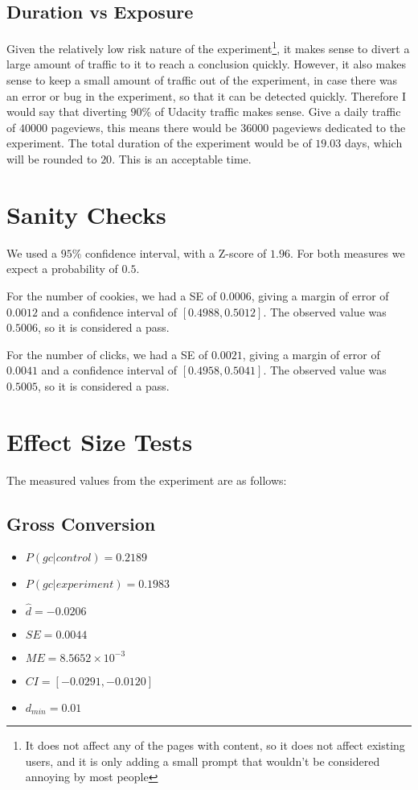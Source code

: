 \documentclass[12pt,a4paper]{article}
\begin{document}
\subsection{Duration vs Exposure}
Given the relatively low risk nature of the experiment\footnote{It does not
affect any of the pages with content, so it does not affect existing users, and
it is only adding a small prompt that wouldn't be considered annoying by most
people}, it makes sense to divert a large amount of traffic to it to reach a
conclusion quickly. However, it also makes sense to keep a small amount of
traffic out of the experiment, in case there was an error or bug in the
experiment, so that it can be detected quickly.  Therefore I would say that
diverting $90$\% of Udacity traffic makes sense. Give a daily traffic of $40000$
pageviews, this means there would be $36000$ pageviews dedicated to the
experiment. The total duration of the experiment would be of $19.03$ days, which
will be rounded to $20$. This is an acceptable time.

\section{Sanity Checks}
We used a $95$\% confidence interval, with a Z-score of $1.96$. For both
measures we expect a probability of $0.5$.

For the number of cookies, we had a SE of $0.0006$, giving a margin of error of
$0.0012$ and a confidence interval of $[ 0.4988, 0.5012 ]$. The observed value
was $0.5006$, so it is considered a pass.

For the number of clicks, we had a SE of $0.0021$, giving a margin of error of
$0.0041$ and a confidence interval of $[ 0.4958, 0.5041 ]$. The observed value
was $0.5005$, so it is considered a pass.

\section{Effect Size Tests}
The measured values from the experiment are as follows:

\subsection{Gross Conversion}
\begin{itemize}
\item $P(gc|control) = 0.2189$
\item $P(gc|experiment) = 0.1983$
\item $\hat{d} = -0.0206$
\item $SE = 0.0044$
\item $ME = 8.5652 \times 10^{-3}$
\item $CI = [-0.0291,-0.0120]$
\item $d_{min} = 0.01$
\end{itemize}
\end{document}
